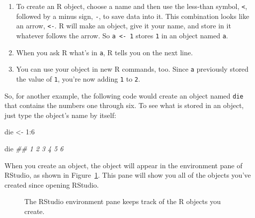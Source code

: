 \documentclass[
  letterpaper,
  DIV=11,
  numbers=noendperiod]{scrbook}
\makeatletter
\newenvironment{Shaded}{\begin{snugshade}}{\end{snugshade}}
\newcommand{\DecValTok}[1]{\textcolor[rgb]{0.68,0.00,0.00}{#1}}
\newcommand{\DocumentationTok}[1]{\textcolor[rgb]{0.37,0.37,0.37}{\textit{#1}}}
\newcommand{\NormalTok}[1]{\textcolor[rgb]{0.00,0.23,0.31}{#1}}
\newcommand{\OtherTok}[1]{\textcolor[rgb]{0.00,0.23,0.31}{#1}}
\newcommand{\SpecialCharTok}[1]{\textcolor[rgb]{0.37,0.37,0.37}{#1}}
\newcommand*\pandocbounded[1]{%
  \sbox\pandoc@box{#1}%
  \Gscale@div\@tempa{\textheight}{\dimexpr\ht\pandoc@box+\dp\pandoc@box\relax}%
  \Gscale@div\@tempb{\linewidth}{\wd\pandoc@box}%
  \ifdim\@tempb\p@<\@tempa\p@\let\@tempa\@tempb\fi%
  \ifdim\@tempa\p@<\p@\scalebox{\@tempa}{\usebox\pandoc@box}%
  \else\usebox{\pandoc@box}%
  \fi%
}
\providecommand{\tightlist}{%
  \setlength{\itemsep}{0pt}\setlength{\parskip}{0pt}}
\makeatother
\begin{document}
\begin{tcolorbox}[enhanced jigsaw, breakable, colback=white, colbacktitle=quarto-callout-note-color!10!white, arc=.35mm, bottomrule=.15mm, coltitle=black, left=2mm, rightrule=.15mm, colframe=quarto-callout-note-color-frame, leftrule=.75mm, opacitybacktitle=0.6, bottomtitle=1mm, toptitle=1mm, titlerule=0mm, opacityback=0, title=\textcolor{quarto-callout-note-color}{\faInfo}\hspace{0.5em}{Note}, toprule=.15mm]

\begin{enumerate}
\def\labelenumi{\arabic{enumi}.}
\tightlist
\item
  To create an R object, choose a name and then use the less-than
  symbol, \texttt{\textless{}}, followed by a minus sign, \texttt{-}, to
  save data into it. This combination looks like an arrow,
  \texttt{\textless{}-}. R will make an object, give it your name, and
  store in it whatever follows the arrow. So \texttt{a\ \textless{}-\ 1}
  stores \texttt{1} in an object named \texttt{a}.
\item
  When you ask R what's in \texttt{a}, R tells you on the next line.
\item
  You can use your object in new R commands, too. Since \texttt{a}
  previously stored the value of \texttt{1}, you're now adding
  \texttt{1} to \texttt{2}.
\end{enumerate}

\end{tcolorbox}

So, for another example, the following code would create an object named
\texttt{die} that contains the numbers one through six. To see what is
stored in an object, just type the object's name by itself:

\begin{Shaded}
\begin{Highlighting}[]
\NormalTok{die }\OtherTok{\textless{}{-}} \DecValTok{1}\SpecialCharTok{:}\DecValTok{6}

\NormalTok{die}
\DocumentationTok{\#\# 1 2 3 4 5 6}
\end{Highlighting}
\end{Shaded}

When you create an object, the object will appear in the environment
pane of RStudio, as shown in Figure~\ref{fig-environment}. This pane
will show you all of the objects you've created since opening RStudio.

\begin{figure}

\centering{

\pandocbounded{\texttt{[image: images/hopr\_0102.png]}}

}

\caption{\label{fig-environment}The RStudio environment pane keeps track
of the R objects you create.}

\end{figure}%
\end{document}
